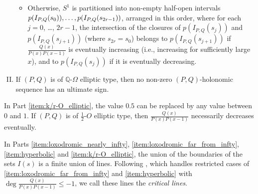 \documentclass[a4paper,UKenglish,cleveref,autoref,thm-restate]{lipics-v2021}
\newcommand{\Q}{\mathbb{Q}}
\begin{document}
\begin{theorem}
\begin{enumerate}[(I)]
\begin{itemize}
\item
Otherwise, 
$S ^1$ is partitioned into
non-empty half-open intervals
$p(I_{P, Q}(s_0)), \dots, \break p(I_{P, Q}(s_{2r-1}))$,
arranged in this order, 
where 
for each $j=0$, \ldots, $2r-1$, 
the intersection of the closures of
$p(I_{P, Q}(s_j))$ and $p(I_{P, Q}(s_{j+1}))$
(where $s_{2r} = s_0$)
belongs to 
$p(I_{P, Q}(s_{j+1}))$ if $\frac{Q(x)}{P(x)P(x-1)}$ is eventually increasing (i.e., increasing for sufficiently large $x$), 
and to $p(I_{P, Q}(s_j))$ if it is eventually decreasing. 
\end{itemize}
\item \label{item:Q-Omega_elliptic}
If $(P, Q)$ is of $\Q$-$\Omega$ elliptic type, 
then no non-zero $(P, Q)$-holonomic sequence has an ultimate sign. 
\end{enumerate}
\end{theorem}


In Part \eqref{item:k/r-O_elliptic}, the value $0.5$ can be replaced by any value between $0$ and $1$. If $(P, Q)$ is of $\frac12$-$O$ elliptic type, then $\frac{Q(x)}{P(x)P(x-1)}$ necessarily decreases eventually. 

In Parts \eqref{item:loxodromic_nearly_infty}, \eqref{item:loxodromic_far_from_infty}, \eqref{item:hyperbolic} and \eqref{item:k/r-O_elliptic}, the union of the boundaries of the sets $I(s)$ is a finite union of lines. Following \cite{NOW21}, which handles restricted cases of \eqref{item:loxodromic_far_from_infty} and \eqref{item:hyperbolic} with $\deg \frac{Q(x)}{P(x)P(x-1)} \leq -1$, we call these lines the \emph{critical lines}. 
\end{document}
